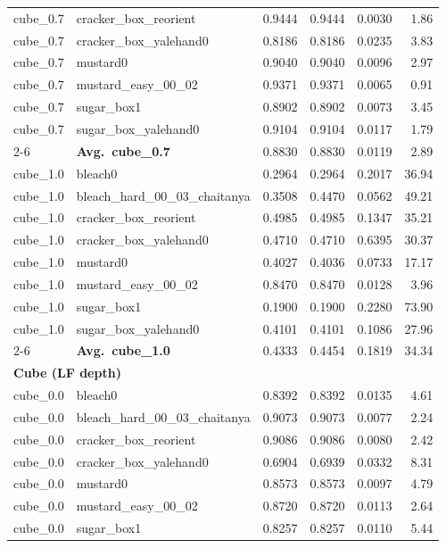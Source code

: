 \begin{longtable}{llrrrr}
  cube_0.7 & cracker\_box\_reorient & 0.9444 & 0.9444 & 0.0030 & 1.86 \\
  cube_0.7 & cracker\_box\_yalehand0 & 0.8186 & 0.8186 & 0.0235 & 3.83 \\
  cube_0.7 & mustard0 & 0.9040 & 0.9040 & 0.0096 & 2.97 \\
  cube_0.7 & mustard\_easy\_00\_02 & 0.9371 & 0.9371 & 0.0065 & 0.91 \\
  cube_0.7 & sugar\_box1 & 0.8902 & 0.8902 & 0.0073 & 3.45 \\
  cube_0.7 & sugar\_box\_yalehand0 & 0.9104 & 0.9104 & 0.0117 & 1.79 \\
  \cmidrule{2-6}
  & \textbf{Avg.~cube_0.7} & 0.8830 & 0.8830 & 0.0119 & 2.89 \\
  \midrule
  cube_1.0 & bleach0 & 0.2964 & 0.2964 & 0.2017 & 36.94 \\
  cube_1.0 & bleach\_hard\_00\_03\_chaitanya & 0.3508 & 0.4470 & 0.0562 & 49.21 \\
  cube_1.0 & cracker\_box\_reorient & 0.4985 & 0.4985 & 0.1347 & 35.21 \\
  cube_1.0 & cracker\_box\_yalehand0 & 0.4710 & 0.4710 & 0.6395 & 30.37 \\
  cube_1.0 & mustard0 & 0.4027 & 0.4036 & 0.0733 & 17.17 \\
  cube_1.0 & mustard\_easy\_00\_02 & 0.8470 & 0.8470 & 0.0128 & 3.96 \\
  cube_1.0 & sugar\_box1 & 0.1900 & 0.1900 & 0.2280 & 73.90 \\
  cube_1.0 & sugar\_box\_yalehand0 & 0.4101 & 0.4101 & 0.1086 & 27.96 \\
  \cmidrule{2-6}
  & \textbf{Avg.~cube_1.0} & 0.4333 & 0.4454 & 0.1819 & 34.34 \\
  \midrule
\multicolumn{6}{l}{\textbf{Cube (LF depth)}} \\
\midrule
  cube_0.0 & bleach0 & 0.8392 & 0.8392 & 0.0135 & 4.61 \\
  cube_0.0 & bleach\_hard\_00\_03\_chaitanya & 0.9073 & 0.9073 & 0.0077 & 2.24 \\
  cube_0.0 & cracker\_box\_reorient & 0.9086 & 0.9086 & 0.0080 & 2.42 \\
  cube_0.0 & cracker\_box\_yalehand0 & 0.6904 & 0.6939 & 0.0332 & 8.31 \\
  cube_0.0 & mustard0 & 0.8573 & 0.8573 & 0.0097 & 4.79 \\
  cube_0.0 & mustard\_easy\_00\_02 & 0.8720 & 0.8720 & 0.0113 & 2.64 \\
  cube_0.0 & sugar\_box1 & 0.8257 & 0.8257 & 0.0110 & 5.44 \\

\end{longtable}
